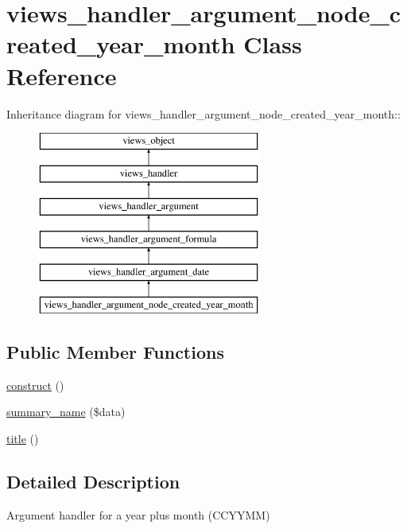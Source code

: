 \hypertarget{classviews__handler__argument__node__created__year__month}{
\section{views\_\-handler\_\-argument\_\-node\_\-created\_\-year\_\-month Class Reference}
\label{classviews__handler__argument__node__created__year__month}
}
Inheritance diagram for views\_\-handler\_\-argument\_\-node\_\-created\_\-year\_\-month::\begin{figure}[H]
\begin{center}
\leavevmode
\includegraphics[height=6cm]{classviews__handler__argument__node__created__year__month}
\end{center}
\end{figure}
\subsection*{Public Member Functions}
\begin{CompactItemize}
\item 
\hyperlink{classviews__handler__argument__node__created__year__month_9e090c0caf0a169fe3f9a78160896d01}{construct} ()
\item 
\hyperlink{classviews__handler__argument__node__created__year__month_05689c48f520a9f0a1dc0008050eae03}{summary\_\-name} (\$data)
\item 
\hyperlink{classviews__handler__argument__node__created__year__month_80dd9527f548e32a8e8f9279fe0ec3d3}{title} ()
\end{CompactItemize}


\subsection{Detailed Description}
Argument handler for a year plus month (CCYYMM) 

